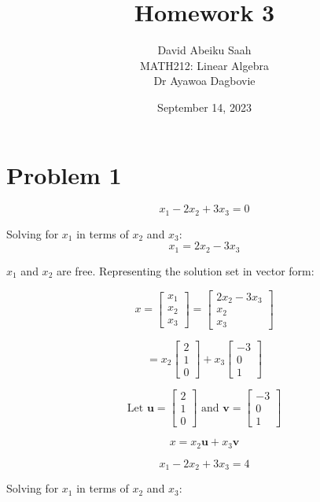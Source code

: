 \documentclass[12pt, a4paper]{article}
\title{
    \textbf{Homework 3} \\ \vspace{1cm}
}
\author{
\vspace*{0.5cm}
    David Abeiku Saah \\ \vspace{0.4cm}
    MATH212: Linear Algebra \\ \vspace{0.5cm}
    Dr Ayawoa Dagbovie \\
}
\date{September 14, 2023}
\begin{document}
\maketitle

\newpage

\section*{Problem 1}

\[
    x_1 - 2x_2 + 3x_3 = 0 \tag{1}
\]

Solving for $x_1$ in terms of $x_2$ and $x_3$:
\[
    x_1 = 2x_2 - 3x_3
\]

$x_1$ and $x_2$ are free. Representing the solution set in vector form:

\[
    x = \begin{bmatrix}
        x_1 \\
        x_2 \\
        x_3
    \end{bmatrix} = \begin{bmatrix}
        2x_2 - 3x_3 \\
        x_2 \\
        x_3
    \end{bmatrix}
\]

\[
    = x_2 \begin{bmatrix}
        2 \\
        1 \\
        0
    \end{bmatrix} + x_3 \begin{bmatrix}
        -3 \\
        0 \\
        1
    \end{bmatrix}
\]

\[
   \text{Let } \boldsymbol{u} = \begin{bmatrix}
        2 \\
        1 \\
        0
    \end{bmatrix} \text{ and } \boldsymbol{v} = \begin{bmatrix}
        -3 \\
        0 \\
        1
    \end{bmatrix}
\]

\[
  x = x_2 \boldsymbol{u} + x_3 \boldsymbol{v}
\]

\[
    x_1 - 2x_2 + 3x_3 = 4 \tag{2}
\]

Solving for $x_1$ in terms of $x_2$ and $x_3$:
\end{document}
